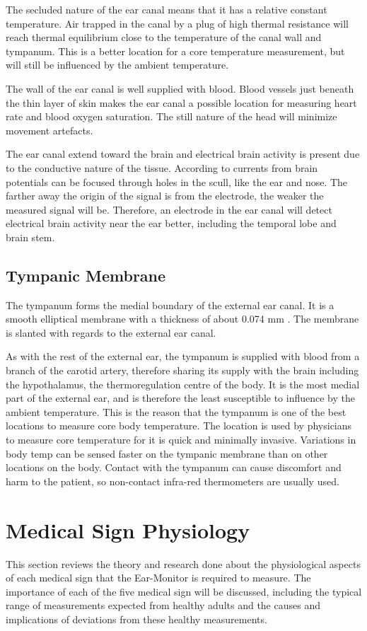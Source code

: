 \medskip
The secluded nature of the ear canal means that it has a relative constant temperature. Air trapped in the canal by a plug of high thermal resistance will reach thermal equilibrium close to the temperature of the canal wall and tympanum. This is a better location for a core temperature measurement, but will still be influenced by the ambient temperature.

\medskip
The wall of the ear canal is well supplied with blood. Blood vessels just beneath the thin layer of skin makes the ear canal a possible location for measuring heart rate and blood oxygen saturation. The still nature of the head will minimize movement artefacts.

\medskip
The ear canal extend toward the brain and electrical brain activity is present due to the conductive nature of the tissue. According to \cite{nunez2006electric} currents from brain potentials can be focused through holes in the scull, like the ear and nose. The farther away the origin of the signal is from the electrode, the weaker the measured signal will be. Therefore, an electrode in the ear canal will detect electrical brain activity near the ear better, including the temporal lobe and brain stem.

\subsection{Tympanic Membrane}
The tympanum forms the medial boundary of the external ear canal. It is a smooth elliptical membrane with a thickness of about 0.074 mm \citep{alvord1997anatomy}. The membrane is slanted with regards to the external ear canal.

\medskip
As with the rest of the external ear, the tympanum is supplied with blood from a branch of the carotid artery, therefore sharing its supply with the brain including the hypothalamus, the thermoregulation centre of the body. It is the most medial part of the external ear, and is therefore the least susceptible to influence by the ambient temperature. This is the reason that the tympanum is one of the best locations to measure core body temperature. The location is used by physicians to measure core temperature for it is quick and minimally invasive. Variations in body temp can be sensed faster on the tympanic membrane than on other locations on the body. Contact with the tympanum can cause discomfort and harm to the patient, so non-contact infra-red thermometers are usually used.


\section{Medical Sign Physiology} %
This section reviews the theory and research done about the physiological aspects of each medical sign that the Ear-Monitor is required to measure. The importance of each of the five medical sign will be discussed, including the typical range of measurements expected from healthy adults and the causes and implications of deviations from these healthy measurements.

